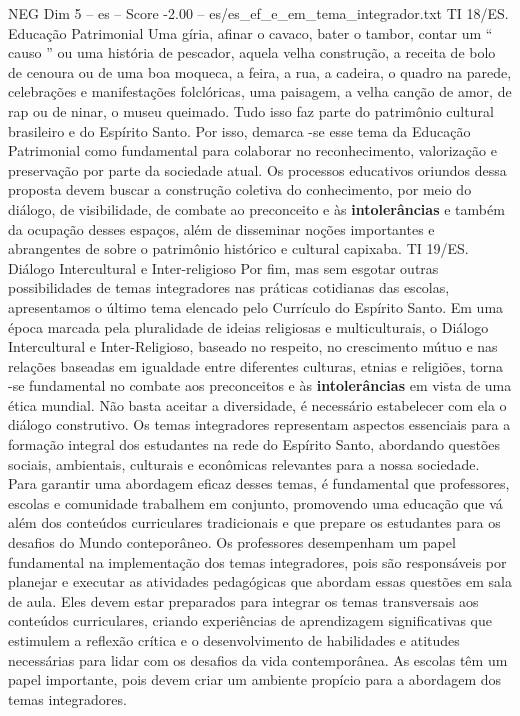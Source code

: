 \begin{textsample}{NEG Dim 5 – es – Score -2.00 – es/es\_ef\_e\_em\_tema\_integrador.txt}
TI 18/ES.
Educação Patrimonial Uma gíria, afinar o cavaco, bater o tambor, contar um “ causo ” ou uma história de pescador, aquela velha construção, a receita de bolo de cenoura ou de uma boa moqueca, a feira, a rua, a cadeira, o quadro na parede, celebrações e manifestações folclóricas, uma paisagem, a velha canção de amor, de rap ou de ninar, o museu queimado.
Tudo isso faz parte do patrimônio cultural brasileiro e do Espírito Santo.
Por isso, demarca -se esse tema da Educação Patrimonial como fundamental para colaborar no reconhecimento, valorização e preservação por parte da sociedade atual.
Os processos educativos oriundos dessa proposta devem buscar a construção coletiva do conhecimento, por meio do diálogo, de visibilidade, de combate ao preconceito e às \textbf{intolerâncias} e também da ocupação desses espaços, além de disseminar noções importantes e abrangentes de sobre o patrimônio histórico e cultural capixaba.
TI 19/ES.
Diálogo Intercultural e Inter-religioso Por fim, mas sem esgotar outras possibilidades de temas integradores nas práticas cotidianas das escolas, apresentamos o último tema elencado pelo Currículo do Espírito Santo.
Em uma época marcada pela pluralidade de ideias religiosas e multiculturais, o Diálogo Intercultural e Inter-Religioso, baseado no respeito, no crescimento mútuo e nas relações baseadas em igualdade entre diferentes culturas, etnias e religiões, torna -se fundamental no combate aos preconceitos e às \textbf{intolerâncias} em vista de uma ética mundial.
Não basta aceitar a diversidade, é necessário estabelecer com ela o diálogo construtivo.
Os temas integradores representam aspectos essenciais para a formação integral dos estudantes na rede do Espírito Santo, abordando questões sociais, ambientais, culturais e econômicas relevantes para a nossa sociedade.
Para garantir uma abordagem eficaz desses temas, é fundamental que professores, escolas e comunidade trabalhem em conjunto, promovendo uma educação que vá além dos conteúdos curriculares tradicionais e que prepare os estudantes para os desafios do Mundo conteporâneo.
Os professores desempenham um papel fundamental na implementação dos temas integradores, pois são responsáveis por planejar e executar as atividades pedagógicas que abordam essas questões em sala de aula.
Eles devem estar preparados para integrar os temas transversais aos conteúdos curriculares, criando experiências de aprendizagem significativas que estimulem a reflexão crítica e o desenvolvimento de habilidades e atitudes necessárias para lidar com os desafios da vida contemporânea.
As escolas têm um papel importante, pois devem criar um ambiente propício para a abordagem dos temas integradores.

\end{textsample}
